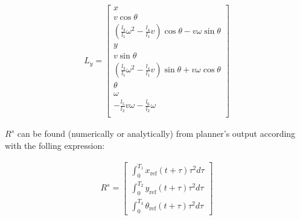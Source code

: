 \documentclass[letterpaper, 10 pt, conference]{ieeeconf}  %
\begin{document}
\begin{eqnarray}
L_y =
\left[\begin{array}{c}
x\\
v\cos\theta\\
\left(\frac{l_3}{l_1}\omega^2 - \frac{l_4}{l_1}v\right)\cos\theta - v\omega\sin\theta\\
y\\
v\sin\theta\\
\left(\frac{l_3}{l_1}\omega^2 - \frac{l_4}{l_1}v\right)\sin\theta + v\omega\cos\theta\\
\theta\\
\omega\\
-\frac{l_5}{l_2}v\omega - \frac{l_6}{l_2}\omega\\
\end{array}\right]
\end{eqnarray}

$R^s$ can be found (numerically or analytically) from planner's output according with the folling expression:

\begin{eqnarray}
R^s =
\left[\begin{array}{c}
\int_0^{T_1}x_{\text{ref}}(t+\tau)\tau^2d\tau\\
\int_0^{T_2}y_{\text{ref}}(t+\tau)\tau^2d\tau\\
\int_0^{T_3}\theta_{\text{ref}}(t+\tau)\tau^2d\tau
\end{array}\right]
\end{eqnarray}



\end{document}
